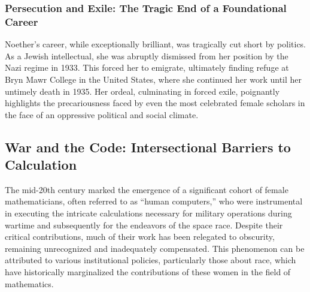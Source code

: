 \subsubsection{Persecution and Exile: The Tragic End of a Foundational Career}
Noether's career, while exceptionally brilliant, was tragically cut short by politics. As a Jewish intellectual, she was abruptly dismissed from her position by the Nazi regime in 1933. This forced her to emigrate, ultimately finding refuge at Bryn Mawr College in the United States, where she continued her work until her untimely death in 1935. Her ordeal, culminating in forced exile, poignantly highlights the precariousness faced by even the most celebrated female scholars in the face of an oppressive political and social climate.

\subsection{War and the Code: Intersectional Barriers to Calculation}
The mid-20th century marked the emergence of a significant cohort of female mathematicians, often referred to as ``human computers,'' who were instrumental in executing the intricate calculations necessary for military operations during wartime and subsequently for the endeavors of the space race. Despite their critical contributions, much of their work has been relegated to obscurity, remaining unrecognized and inadequately compensated. This phenomenon can be attributed to various institutional policies, particularly those about race, which have historically marginalized the contributions of these women in the field of mathematics.


